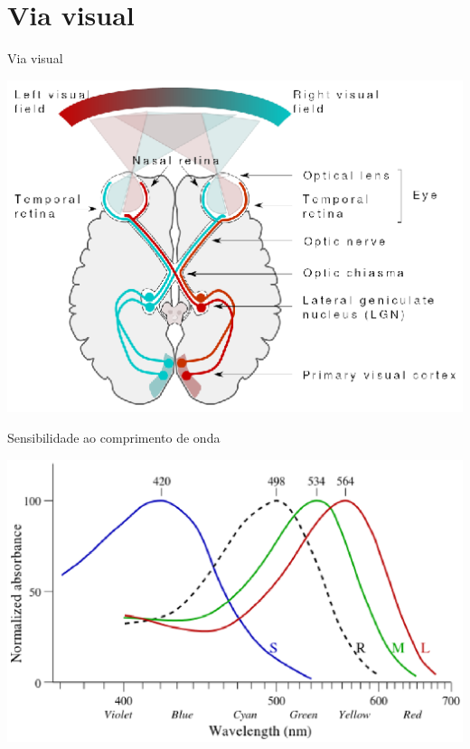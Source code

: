      \section[ slide = true]{Via visual}
      \begin{slide}[toc=]{Via visual}
         \begin{center}
            \includegraphics[width=.7\textwidth]{figs/visual_pathway}
         \end{center}
      \end{slide}

      \begin{slide}[toc=]{Sensibilidade ao comprimento de onda}
         \begin{center}
            \includegraphics[width=.8\textwidth]{figs/cb_resp}
         \end{center}
      \end{slide}
      
